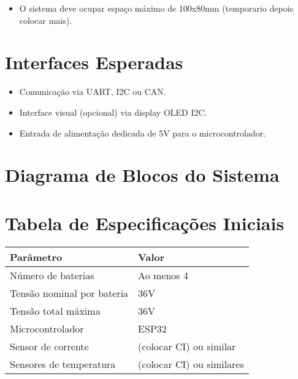 \documentclass[12pt]{article}
\begin{document}
\begin{itemize}
    \item O sistema deve ocupar espaço máximo de 100x80mm (temporario depois colocar mais).

\end{itemize}

\section{Interfaces Esperadas}

\begin{itemize}
    \item Comunicação via UART, I2C ou CAN.
    \item Interface visual (opcional) via display OLED I2C.
    \item Entrada de alimentação dedicada de 5V para o microcontrolador.
\end{itemize}

\section{Diagrama de Blocos do Sistema}

\vspace{1cm}
\begin{center}
    \end{center}
\vspace{1cm}

\section{Tabela de Especificações Iniciais}

\begin{longtable}{|p{}|p{}|}
\hline
\textbf{Parâmetro} & \textbf{Valor} \\
\hline
Número de baterias & Ao menos 4 \\
\hline
Tensão nominal por bateria & 36V \\
\hline
Tensão total máxima & 36V \\
\hline
Microcontrolador & ESP32 \\
\hline
Sensor de corrente & (colocar CI) ou similar \\
\hline
Sensores de temperatura & (colocar CI) ou similares \\
\hline
\end{longtable}
\end{document}
